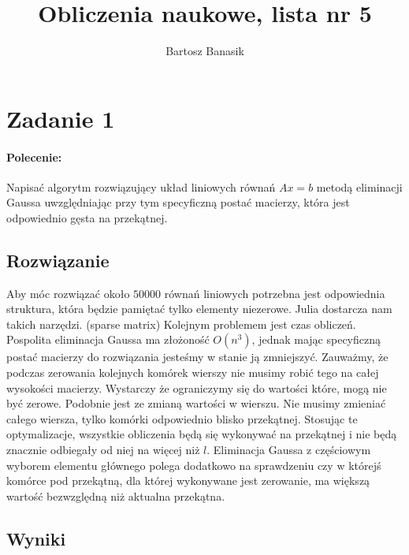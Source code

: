 \documentclass{article}
\begin{document}
		\title{Obliczenia naukowe, lista nr 5}
	\author{Bartosz Banasik}
	\maketitle
	
	
	\section{Zadanie 1}
	\paragraph{Polecenie:}
	Napisać algorytm rozwiązujący układ liniowych równań $Ax = b$ metodą eliminacji Gaussa uwzględniając przy tym specyficzną postać macierzy, która jest odpowiednio gęsta na przekątnej.
	\subsection{Rozwiązanie}
	 Aby móc rozwiązać około $50000$ równań liniowych potrzebna jest odpowiednia struktura, która będzie pamiętać tylko elementy niezerowe. Julia dostarcza nam takich narzędzi. (sparse matrix) Kolejnym problemem jest czas obliczeń. Pospolita eliminacja Gaussa ma złożoność $O(n^3)$, jednak mając specyficzną postać macierzy do rozwiązania jesteśmy w stanie ją zmniejszyć. Zauważmy, że podczas zerowania kolejnych komórek wierszy nie musimy robić tego na całej wysokości macierzy. Wystarczy że ograniczymy się do wartości które, mogą nie być zerowe. Podobnie jest ze zmianą wartości w wierszu. Nie musimy zmieniać całego wiersza, tylko komórki odpowiednio blisko przekątnej. Stosując te optymalizacje, wszystkie obliczenia będą się wykonywać na przekątnej i nie będą znacznie odbiegały od niej na więcej niż $l$.  Eliminacja Gaussa z częściowym wyborem elementu głównego polega dodatkowo na sprawdzeniu czy w którejś komórce pod przekątną, dla której wykonywane jest zerowanie, ma większą wartość bezwzględną niż aktualna przekątna.
	\subsection{Wyniki}
	
\end{document}
